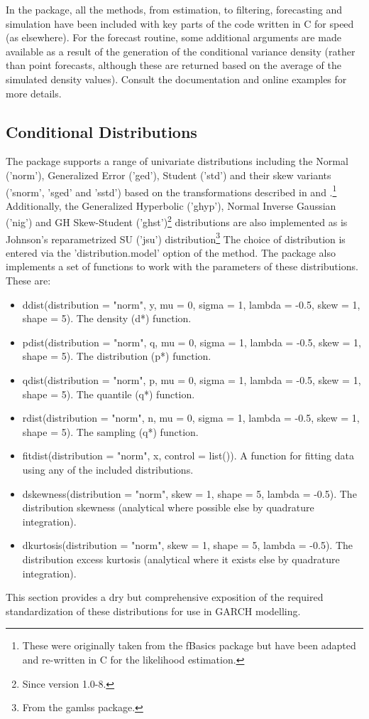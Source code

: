 In the \verb@rugarch@ package, all the methods, from estimation, to filtering, forecasting and simulation have been included with key parts of the code written in C for speed (as elsewhere). For the forecast routine, some additional arguments are made available as a result of the generation of the conditional variance density (rather than point forecasts, although these are returned based on the average of the simulated density values). Consult the documentation and online examples for more details.

\subsection{Conditional Distributions}\label{section:distributions}
The \verb@rugarch@ package supports a range of univariate distributions
including the Normal ('norm'), Generalized Error ('ged'), Student ('std')
and their skew variants ('snorm', 'sged' and 'sstd') based on the transformations
described in \cite{Fernandez1998} and \cite{Ferreira2006}.\footnote{These were
originally taken from the fBasics package  but have been adapted and re-written
in C for the likelihood estimation.} Additionally, the Generalized Hyperbolic
('ghyp'), Normal Inverse Gaussian ('nig') and GH Skew-Student ('ghst')\footnote{Since version 1.0-8.}
distributions are also implemented as is Johnson's reparametrized SU ('jsu')
distribution\footnote{From the gamlss package.} The choice of distribution is entered via the
'distribution.model' option of the \verb@ugarchspec@ method. The package also
implements a set of functions to work with the parameters of these distributions.
These are:
\begin{itemize}
\item ddist(distribution = "norm", y, mu = 0, sigma = 1, lambda = -0.5, skew = 1, shape = 5). The density (d*) function.
\item pdist(distribution = "norm", q, mu = 0, sigma = 1, lambda = -0.5, skew = 1, shape = 5). The distribution (p*) function.
\item qdist(distribution = "norm", p, mu = 0, sigma = 1, lambda = -0.5, skew = 1, shape = 5). The quantile (q*) function.
\item rdist(distribution = "norm", n, mu = 0, sigma = 1, lambda = -0.5, skew = 1, shape = 5). The sampling (q*) function.
\item fitdist(distribution = "norm", x, control = list()). A function for fitting data using any of the included distributions.
\item dskewness(distribution = "norm", skew = 1, shape = 5, lambda = -0.5). The distribution skewness (analytical where possible else by quadrature integration).
\item dkurtosis(distribution = "norm", skew = 1, shape = 5, lambda = -0.5). The distribution excess kurtosis (analytical where it exists else by quadrature integration).
\end{itemize}
This section provides a dry but comprehensive exposition of the required
standardization of these distributions for use in GARCH modelling.

